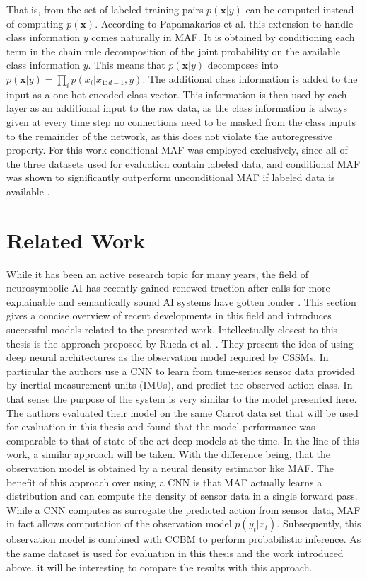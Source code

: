 \documentclass[11pt,titlepage,oneside,openany]{book}
\begin{document}
That is, from the set of labeled training pairs $p(\pmb{x}|y)$ can be computed instead of computing $p(\pmb{x})$. According to Papamakarios et al. \cite{papamakarios_masked_2017} this extension to handle class information $y$ comes naturally in MAF. It is obtained by conditioning each term in the chain rule decomposition of the joint probability on the available class information $y$. This means that $p(\pmb{x}|y)$ decomposes into $p(\pmb{x}|y) = \prod_{i}^{} p(x_i|x_{1:d-1},y)$. The additional class information is added to the input as a one hot encoded class vector. This information is then used by each layer as an additional input to the raw data, as the class information is always given at every time step no connections need to be masked from the class inputs to the remainder of the network, as this does not violate the autoregressive property. For this work conditional MAF was employed exclusively, since all of the three datasets used for evaluation contain labeled data, and conditional MAF was shown to significantly outperform unconditional MAF if labeled data is available \cite{papamakarios_masked_2017}.


\chapter{Related Work}
\label{cha:rel}

While it has been an active research topic for many years, the field of neurosymbolic AI has recently gained renewed traction after calls for more explainable and semantically sound AI systems have gotten louder \cite{garcez_neurosymbolic_2020}. This section gives a concise overview of recent developments in this field and introduces successful models related to the presented work.
Intellectually closest to this thesis is the approach proposed by Rueda et al. \cite{rueda_combining_2019}. They present the idea of using deep neural architectures as the observation model required by CSSMs. In particular the authors use a CNN to learn from time-series sensor data provided by inertial measurement units (IMUs), and predict the observed action class. In that sense the purpose of the system is very similar to the model presented here. The authors evaluated their model on the same Carrot data set that will be used for evaluation in this thesis and found that the model performance was comparable to that of state of the art deep models at the time. In the line of this work, a similar approach will be taken. With the difference being, that the observation model is obtained by a neural density estimator like MAF. The benefit of this approach over using a CNN is that MAF actually learns a distribution and can compute the density of sensor data in a single forward pass. While a CNN computes as surrogate the predicted action from sensor data, MAF in fact allows computation of the observation model $p(y_t|x_t)$. Subsequently, this observation model is combined with CCBM to perform probabilistic inference. As the same dataset is used for evaluation in this thesis and the work introduced above, it will be interesting to compare the results with this approach.
\end{document}
